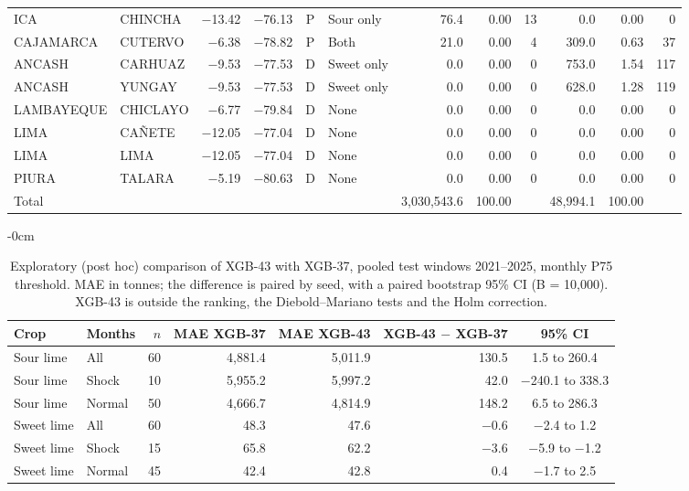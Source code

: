 \begin{landscape}
\begin{longtable}{llrrclrrrrrr}
ICA & CHINCHA & $-$13.42 & $-$76.13 & P & Sour only & 76.4 & 0.00 & 13 & 0.0 & 0.00 & 0 \\
CAJAMARCA & CUTERVO & $-$6.38 & $-$78.82 & P & Both & 21.0 & 0.00 & 4 & 309.0 & 0.63 & 37 \\
ANCASH & CARHUAZ & $-$9.53 & $-$77.53 & D & Sweet only & 0.0 & 0.00 & 0 & 753.0 & 1.54 & 117 \\
ANCASH & YUNGAY & $-$9.53 & $-$77.53 & D & Sweet only & 0.0 & 0.00 & 0 & 628.0 & 1.28 & 119 \\
LAMBAYEQUE & CHICLAYO & $-$6.77 & $-$79.84 & D & None & 0.0 & 0.00 & 0 & 0.0 & 0.00 & 0 \\
LIMA & CAÑETE & $-$12.05 & $-$77.04 & D & None & 0.0 & 0.00 & 0 & 0.0 & 0.00 & 0 \\
LIMA & LIMA & $-$12.05 & $-$77.04 & D & None & 0.0 & 0.00 & 0 & 0.0 & 0.00 & 0 \\
PIURA & TALARA & $-$5.19 & $-$80.63 & D & None & 0.0 & 0.00 & 0 & 0.0 & 0.00 & 0 \\
Total &  &  &  &  &  & 3,030,543.6 & 100.00 &  & 48,994.1 & 100.00 &  \\
\end{longtable}
\end{landscape}

\begin{table}[H]
\centering
\footnotesize
\setlength{\tabcolsep}{4pt}
\caption{Exploratory (post hoc) comparison of XGB-43 with XGB-37, pooled test windows 2021--2025, monthly P75 threshold. MAE in tonnes; the difference is paired by seed, with a paired bootstrap 95\% CI (B = 10,000). XGB-43 is outside the ranking, the Diebold--Mariano tests and the Holm correction.}
\label{tab:T16_exploratorio_xgb43}
\begin{adjustwidth}{-\extralength}{0cm}
\centering
\begin{tabular}{llrrrrc}
\toprule
Crop & Months & $n$ & MAE XGB-37 & MAE XGB-43 & XGB-43 $-$ XGB-37 & 95\% CI \\
\midrule
Sour lime & All & 60 & 4,881.4 & 5,011.9 & 130.5 & 1.5 to 260.4 \\
Sour lime & Shock & 10 & 5,955.2 & 5,997.2 & 42.0 & $-$240.1 to 338.3 \\
Sour lime & Normal & 50 & 4,666.7 & 4,814.9 & 148.2 & 6.5 to 286.3 \\
\addlinespace
Sweet lime & All & 60 & 48.3 & 47.6 & $-$0.6 & $-$2.4 to 1.2 \\
Sweet lime & Shock & 15 & 65.8 & 62.2 & $-$3.6 & $-$5.9 to $-$1.2 \\
Sweet lime & Normal & 45 & 42.4 & 42.8 & 0.4 & $-$1.7 to 2.5 \\
\bottomrule
\end{tabular}
\end{adjustwidth}
\end{table}

